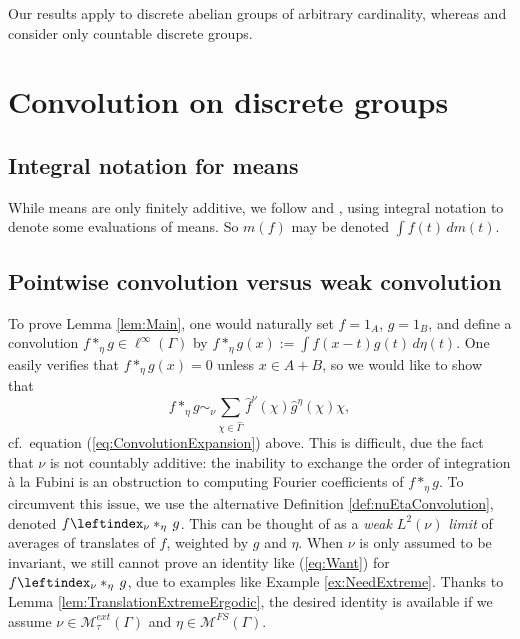 \documentclass[12pt]{amsart} \usepackage{amsmath,centernot,amssymb,leftindex}
\numberwithin{theorem}{section}
\numberwithin{equation}{section}
\theoremstyle{definition}
\begin{document}
	Our results apply to discrete abelian groups of arbitrary cardinality, whereas \cite{BjorklundFish_ProductSet} and \cite{BjorklundFish_ApproxInvariance} consider only countable discrete groups.
	
	
	
	
	\section{Convolution on discrete groups}\label{sec:Outline}
	
		\subsection{Integral notation for means}  While means are only finitely additive, we follow \cite{BjorklundFish_ProductSet} and \cite{BjorklundFish_ApproxInvariance}, using integral notation to denote some evaluations of means.  So $m(f)$ may be denoted $\int f(t)\, dm(t)$.
	 
\subsection{Pointwise convolution versus weak convolution}	To prove Lemma \ref{lem:Main}, one would naturally set $f=1_A$, $g=1_B$, and define a convolution $f*_\eta g\in \ell^\infty(\Gamma)$ by $f*_\eta g(x):= \int f(x-t)g(t)\, d\eta(t)$.  One easily verifies that $f*_\eta g(x)=0$ unless $x\in A+B$, so we would like to show that
\begin{equation}\label{eq:Want}
	f*_\eta g \sim_\nu \sum_{\chi\in\widehat{\Gamma}} \hat{f}^\nu(\chi) \hat{g}^\eta(\chi) \chi,
\end{equation} cf.~equation (\ref{eq:ConvolutionExpansion}) above. This is difficult,  due the fact that $\nu$ is not countably additive: the inability to exchange the order of integration \`a la Fubini is an obstruction to computing Fourier coefficients of $f*_\eta g$.  To circumvent this issue, we use the alternative Definition \ref{def:nuEtaConvolution}, denoted $f\leftindex_{\nu}*_\eta\, g$. This can be thought of as a \emph{weak $L^2(\nu)$ limit} of averages of translates of $f$, weighted by $g$ and $\eta$.  When $\nu$ is only assumed to be invariant, we still cannot prove an identity  like (\ref{eq:Want}) for $f\leftindex_{\nu}*_\eta\, g$, due to examples like Example \ref{ex:NeedExtreme}.  Thanks to Lemma \ref{lem:TranslationExtremeErgodic},  the desired identity is available if we assume $\nu\in \mathcal M_{\tau}^{ext}(\Gamma)$ and $\eta\in \mathcal M^{FS}(\Gamma)$.
	
\end{document}
